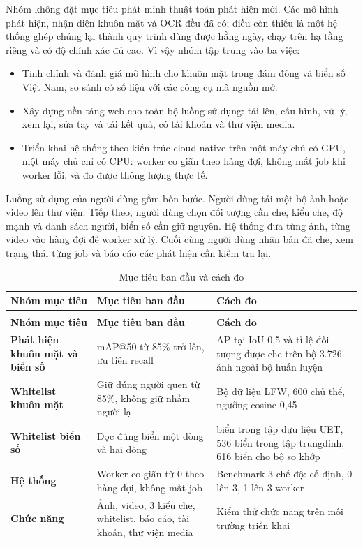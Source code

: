 \documentclass[a4paper,12pt]{article}
\newcommand{\bangfont}{\fontsize{11}{14}\selectfont\setlength{\tabcolsep}{4.2pt}\renewcommand{\arraystretch}{1.2}}
\newcommand{\dongdau}{\rowcolor[gray]{0.92}}
\begin{document}
Nhóm không đặt mục tiêu phát minh thuật toán phát hiện mới. Các mô hình phát hiện, nhận diện khuôn mặt và OCR đều đã có; điều còn thiếu là một hệ thống ghép chúng lại thành quy trình dùng được hằng ngày, chạy trên hạ tầng riêng và có độ chính xác đủ cao. Vì vậy nhóm tập trung vào ba việc:

\begin{itemize}[leftmargin=*,itemsep=2pt,parsep=0pt]
  \item Tinh chỉnh và đánh giá mô hình cho khuôn mặt trong đám đông và biển số Việt Nam, so sánh có số liệu với các công cụ mã nguồn mở.
  \item Xây dựng nền tảng web cho toàn bộ luồng sử dụng: tải lên, cấu hình, xử lý, xem lại, sửa tay và tải kết quả, có tài khoản và thư viện media.
  \item Triển khai hệ thống theo kiến trúc cloud-native trên một máy chủ có GPU, một máy chủ chỉ có CPU: worker co giãn theo hàng đợi, không mất job khi worker lỗi, và đo được thông lượng thực tế.
\end{itemize}

Luồng sử dụng của người dùng gồm bốn bước. Người dùng tải một bộ ảnh hoặc video lên thư viện. Tiếp theo, người dùng chọn đối tượng cần che, kiểu che, độ mạnh và danh sách người, biển số cần giữ nguyên. Hệ thống đưa từng ảnh, từng video vào hàng đợi để worker xử lý. Cuối cùng người dùng nhận bản đã che, xem trạng thái từng job và báo cáo các phát hiện cần kiểm tra lại.

{\bangfont
\begin{longtable}{|>{\raggedright\arraybackslash\bfseries}m{3.96cm}|>{\raggedright\arraybackslash}m{5.45cm}|>{\raggedright\arraybackslash}m{5.64cm}|}
\caption{Mục tiêu ban đầu và cách đo}\label{tab:1-2}\\
\hline
\dongdau \textbf{Nhóm mục tiêu} & \textbf{Mục tiêu ban đầu} & \textbf{Cách đo} \\
\hline
\endfirsthead
\multicolumn{3}{c}{\textbf{Bảng 1.2.} Mục tiêu ban đầu và cách đo (tiếp theo)}\\[2pt]
\hline
\dongdau \textbf{Nhóm mục tiêu} & \textbf{Mục tiêu ban đầu} & \textbf{Cách đo} \\
\hline
\endhead
\endfoot
\endlastfoot
Phát hiện khuôn mặt và biển số & mAP@50 từ 85\% trở lên, ưu tiên recall & AP tại IoU 0,5 và tỉ lệ đối tượng được che trên bộ 3.726 ảnh ngoài bộ huấn luyện \\ \hline
Whitelist khuôn mặt & Giữ đúng người quen từ 85\%, không giữ nhầm người lạ & Bộ dữ liệu LFW, 600 chủ thể, ngưỡng cosine 0,45 \\ \hline
Whitelist biển số & Đọc đúng biển một dòng và hai dòng & 80 biển trong tập dữu liệu UET, 536 biển trong tập trungdinh, 616 biển cho bộ so khớp \\ \hline
Hệ thống & Worker co giãn từ 0 theo hàng đợi, không mất job & Benchmark 3 chế độ: cố định, 0 lên 3, 1 lên 3 worker \\ \hline
Chức năng & Ảnh, video, 3 kiểu che, whitelist, báo cáo, tài khoản, thư viện media & Kiểm thử chức năng trên môi trường triển khai \\ \hline
\end{longtable}
}
\vspace{6pt}
\end{document}
